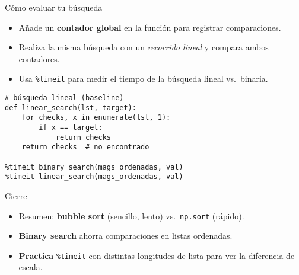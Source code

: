 \documentclass[10pt]{beamer}
\begin{document}
\begin{frame}[fragile]{Cómo evaluar tu búsqueda}
\begin{itemize}
  \item Añade un \textbf{contador global} en la función para registrar comparaciones.  
  \item Realiza la misma búsqueda con un \emph{recorrido lineal} y compara ambos contadores.  
  \item Usa \texttt{\%timeit} para medir el tiempo de la búsqueda lineal vs.\ binaria.  
\end{itemize}

\vspace{0.3cm}
\begin{verbatim}
# búsqueda lineal (baseline)
def linear_search(lst, target):
    for checks, x in enumerate(lst, 1):
        if x == target:
            return checks
    return checks  # no encontrado

%timeit binary_search(mags_ordenadas, val)
%timeit linear_search(mags_ordenadas, val)
\end{verbatim}
\end{frame}

\begin{frame}{Cierre}
\begin{itemize}
  \item Resumen: \textbf{bubble sort} (sencillo, lento) vs.\ \texttt{np.sort} (rápido).  
  \item \textbf{Binary search} ahorra comparaciones en listas ordenadas.  
  \item \textbf{Practica} \texttt{\%timeit} con distintas longitudes de lista para ver la
        diferencia de escala.  
\end{itemize}
\end{frame}
\end{document}
